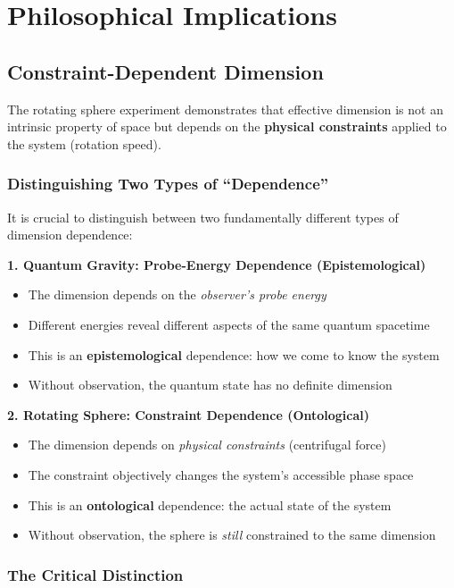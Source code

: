 \documentclass[12pt,a4paper]{article}
\begin{document}
\section{Philosophical Implications}
\label{sec:philosophy}

\subsection{Constraint-Dependent Dimension}

The rotating sphere experiment demonstrates that effective dimension is not an intrinsic property of space but depends on the \textbf{physical constraints} applied to the system (rotation speed).

\subsubsection{Distinguishing Two Types of ``Dependence''}

It is crucial to distinguish between two fundamentally different types of dimension dependence:

\textbf{1. Quantum Gravity: Probe-Energy Dependence (Epistemological)}
\begin{itemize}
    \item The dimension depends on the \textit{observer's probe energy}
    \item Different energies reveal different aspects of the same quantum spacetime
    \item This is an \textbf{epistemological} dependence: how we come to know the system
    \item Without observation, the quantum state has no definite dimension
\end{itemize}

\textbf{2. Rotating Sphere: Constraint Dependence (Ontological)}
\begin{itemize}
    \item The dimension depends on \textit{physical constraints} (centrifugal force)
    \item The constraint objectively changes the system's accessible phase space
    \item This is an \textbf{ontological} dependence: the actual state of the system
    \item Without observation, the sphere is \textit{still} constrained to the same dimension
\end{itemize}

\subsubsection{The Critical Distinction}
\end{document}
